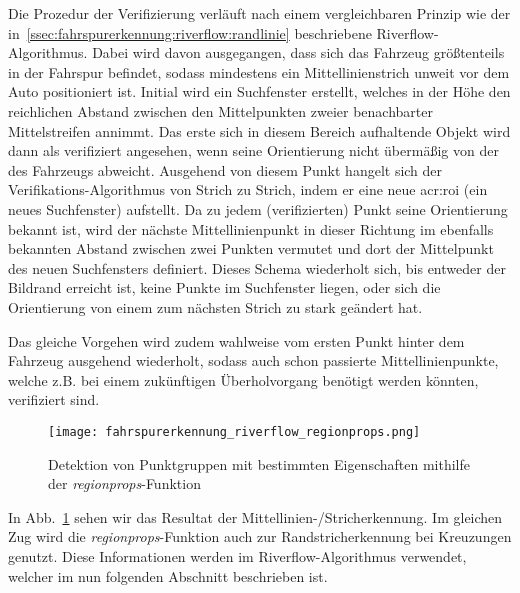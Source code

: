 Die Prozedur der Verifizierung verläuft nach einem vergleichbaren Prinzip wie der in~\ref{ssec:fahrspurerkennung:riverflow:randlinie} beschriebene Riverflow-Algorithmus. Dabei wird davon ausgegangen, dass sich das Fahrzeug größtenteils in der Fahrspur befindet, sodass mindestens ein Mittellinienstrich unweit vor dem Auto positioniert ist. Initial wird ein Suchfenster erstellt, welches in der Höhe den reichlichen Abstand zwischen den Mittelpunkten zweier benachbarter Mittelstreifen annimmt. Das erste sich in diesem Bereich aufhaltende Objekt wird dann als verifiziert angesehen, wenn seine Orientierung nicht übermäßig von der des Fahrzeugs abweicht. Ausgehend von diesem Punkt \glqq hangelt\grqq{} sich der Verifikations-Algorithmus von Strich zu Strich, indem er eine neue \gls{acr:roi} (ein neues Suchfenster) aufstellt. Da zu jedem (verifizierten) Punkt seine Orientierung bekannt ist, wird der nächste Mittellinienpunkt in dieser Richtung im ebenfalls bekannten Abstand zwischen zwei Punkten vermutet und dort der Mittelpunkt des neuen Suchfensters definiert. Dieses Schema wiederholt sich, bis entweder der Bildrand erreicht ist, keine Punkte im Suchfenster liegen, oder sich die Orientierung von einem zum nächsten Strich zu stark geändert hat.

Das gleiche Vorgehen wird zudem wahlweise vom ersten Punkt hinter dem Fahrzeug ausgehend wiederholt, sodass auch schon passierte Mittellinienpunkte, welche z.B. bei einem zukünftigen Überholvorgang benötigt werden könnten, verifiziert sind.

\begin{figure}[H]
	\centering
	\texttt{[image: fahrspurerkennung\_riverflow\_regionprops.png]}
	\caption{Detektion von Punktgruppen mit bestimmten Eigenschaften mithilfe der \emph{regionprops}-Funktion}
	\label{fig:riverflow:mittellinie:regionprops}
\end{figure}

In Abb.~\ref{fig:riverflow:mittellinie:regionprops} sehen wir das Resultat der Mittellinien-/Stricherkennung. Im gleichen Zug wird die \emph{regionprops}-Funktion auch zur Randstricherkennung bei Kreuzungen genutzt. Diese Informationen werden im Riverflow-Algorithmus verwendet, welcher im nun folgenden Abschnitt beschrieben ist.